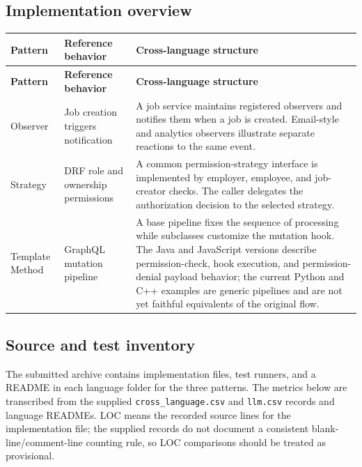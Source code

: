\documentclass[11pt,a4paper]{article}
\newcommand{\code}[1]{\texttt{#1}}
\begin{document}
\subsection{Implementation overview}

\begin{longtable}{p{2.2cm}p{3.0cm}p{8.0cm}}
\toprule
\textbf{Pattern} & \textbf{Reference behavior} & \textbf{Cross-language structure} \\
\midrule
\endfirsthead
\toprule
\textbf{Pattern} & \textbf{Reference behavior} & \textbf{Cross-language structure} \\
\midrule
\endhead
Observer & Job creation triggers notification & A job service maintains registered observers and notifies them when a job is created. Email-style and analytics observers illustrate separate reactions to the same event. \\
\addlinespace
Strategy & DRF role and ownership permissions & A common permission-strategy interface is implemented by employer, employee, and job-creator checks. The caller delegates the authorization decision to the selected strategy. \\
\addlinespace
Template Method & GraphQL mutation pipeline & A base pipeline fixes the sequence of processing while subclasses customize the mutation hook. The Java and JavaScript versions describe permission-check, hook execution, and permission-denial payload behavior; the current Python and C++ examples are generic pipelines and are not yet faithful equivalents of the original flow. \\
\bottomrule
\end{longtable}

\subsection{Source and test inventory}

The submitted archive contains implementation files, test runners, and a README in each language folder for the three patterns. The metrics below are transcribed from the supplied \code{cross\_language.csv} and \code{llm.csv} records and language READMEs. LOC means the recorded source lines for the implementation file; the supplied records do not document a consistent blank-line/comment-line counting rule, so LOC comparisons should be treated as provisional.
\end{document}

